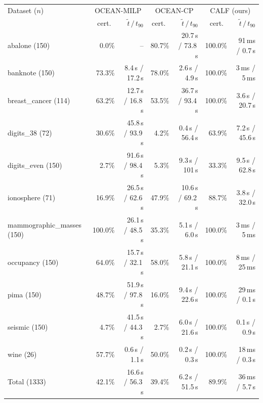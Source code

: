 \begin{tabular}{lrrrrrr}
\toprule
Dataset ($n$) & \multicolumn{2}{c}{OCEAN-MILP} & \multicolumn{2}{c}{OCEAN-CP} & \multicolumn{2}{c}{CALF (ours)} \\
 & cert.\ & $\tilde t\,/\,t_{90}$ & cert.\ & $\tilde t\,/\,t_{90}$ & cert.\ & $\tilde t\,/\,t_{90}$ \\
\midrule
abalone (150) & 0.0\% & -- & 80.7\% & 20.7\,s / 73.8\,s & 100.0\% & 91\,ms / 0.7\,s \\
banknote (150) & 73.3\% & 8.4\,s / 17.2\,s & 78.0\% & 2.6\,s / 4.9\,s & 100.0\% & 3\,ms / 5\,ms \\
breast\_cancer (114) & 63.2\% & 12.7\,s / 16.8\,s & 53.5\% & 36.7\,s / 93.4\,s & 100.0\% & 3.6\,s / 20.7\,s \\
digits\_38 (72) & 30.6\% & 45.8\,s / 93.9\,s & 4.2\% & 0.4\,s / 56.4\,s & 63.9\% & 7.2\,s / 45.6\,s \\
digits\_even (150) & 2.7\% & 91.6\,s / 98.4\,s & 5.3\% & 9.3\,s / 101\,s & 33.3\% & 9.5\,s / 62.8\,s \\
ionosphere (71) & 16.9\% & 26.5\,s / 62.6\,s & 47.9\% & 10.6\,s / 69.2\,s & 88.7\% & 3.8\,s / 32.0\,s \\
mammographic\_masses (150) & 100.0\% & 26.1\,s / 48.5\,s & 35.3\% & 5.1\,s / 6.0\,s & 100.0\% & 3\,ms / 5\,ms \\
occupancy (150) & 64.0\% & 15.7\,s / 32.1\,s & 58.0\% & 5.8\,s / 21.1\,s & 100.0\% & 8\,ms / 25\,ms \\
pima (150) & 48.7\% & 51.9\,s / 97.8\,s & 16.0\% & 9.4\,s / 22.6\,s & 100.0\% & 29\,ms / 0.1\,s \\
seismic (150) & 4.7\% & 41.5\,s / 44.3\,s & 2.7\% & 6.0\,s / 21.6\,s & 100.0\% & 0.1\,s / 0.9\,s \\
wine (26) & 57.7\% & 0.6\,s / 1.1\,s & 50.0\% & 0.2\,s / 0.3\,s & 100.0\% & 18\,ms / 0.3\,s \\
\midrule Total (1333) & 42.1\% & 16.6\,s / 56.3\,s & 39.4\% & 6.2\,s / 51.5\,s & 89.9\% & 36\,ms / 5.7\,s \\
\bottomrule
\end{tabular}
